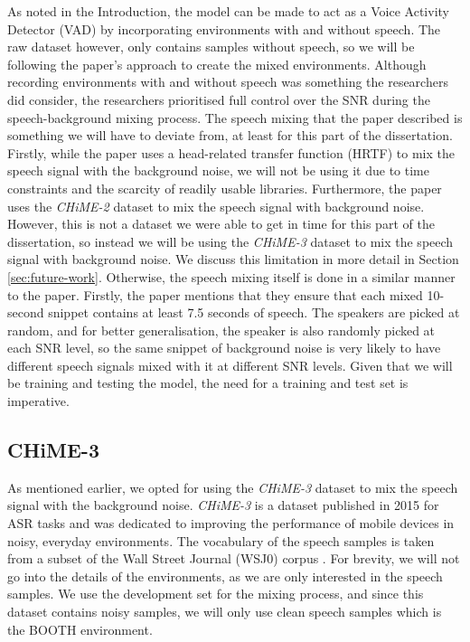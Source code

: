 \documentclass[logo,bsc,singlespacing,parskip,online]{infthesis}
\newcommand{\chime}[1]{\textit{CHiME-#1}\xspace}
\begin{document}
As noted in the Introduction, the model can be made to act as a Voice Activity Detector (VAD) by incorporating environments with and without speech.
The raw dataset however, only contains samples without speech, so we will be following the paper's approach to create the mixed environments.
Although recording environments with and without speech was something the researchers did consider, the researchers prioritised full control over the SNR during the speech-background mixing process.
The speech mixing that the paper described is something we 
will have to deviate from, at least for this part of the dissertation.
Firstly, while the paper uses a head-related transfer function (HRTF) to mix the speech signal with the background noise,
we will not be using it due to time constraints and the scarcity of readily usable libraries.
Furthermore, the paper uses the \chime{2} dataset \citep{vincent_second_2013} to mix the speech signal with background noise.
However, this is not a dataset we were able to get in time for this part 
of the dissertation, so instead we will be using the \chime{3} dataset \citep{barker_third_2015} to mix the speech signal with background noise.
We discuss this limitation in more detail in Section \ref{sec:future-work}.
Otherwise, the speech mixing itself is done in a similar manner to the paper.
Firstly, the paper mentions that they ensure that each mixed 10-second snippet contains at least 7.5 seconds of speech.
The speakers are picked at random, and for better generalisation, the speaker is also randomly 
picked at each SNR level, so the same snippet of background noise is very likely 
to have different speech signals mixed with it at different SNR levels.
Given that we will be training and testing the model, the need for a training and test set is imperative. 

\subsection{CHiME-3}
 As mentioned earlier, we opted for using the \chime{3} dataset to mix the speech signal with the background noise. 
\chime{3} is a dataset published in 2015 for ASR tasks and was dedicated to improving the performance of mobile devices 
in noisy, everyday environments. The vocabulary of the speech samples is taken from a subset of the Wall Street Journal (WSJ0) corpus \citep{wsj0}.
For brevity, we will not go into the details of the environments, as we 
are only interested in the speech samples. 
We use the development set for the mixing process,
and since this dataset contains noisy samples, we will only use clean speech samples 
which is the BOOTH environment.
\end{document}
